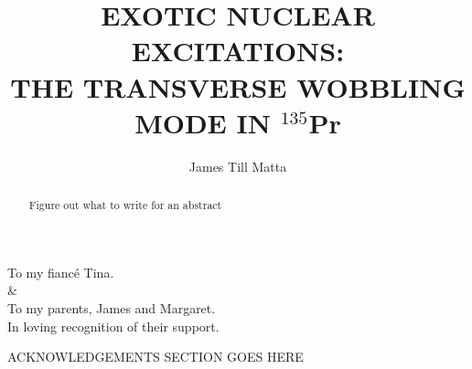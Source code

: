 \documentclass[final,numrefs,sort&compress]{nddiss2e}
\newcommand{\pr}{$^{135}$Pr}
\begin{document}
\frontmatter 
\title{EXOTIC NUCLEAR EXCITATIONS:\\
THE TRANSVERSE WOBBLING MODE IN \pr{}}
\author{James Till Matta}

\maketitle
%
%

\makecopyright

\begin{abstract}
  Figure out what to write for an abstract
\end{abstract}

\renewcommand{\dedicationname}{DEDICATED TO:}

\begin{dedication}
	To my fianc\'e Tina.\\\&\\To my parents, James and Margaret.\\
	In loving recognition of their support.
\end{dedication}

\tableofcontents
\listoffigures
\listoftables

\begin{acknowledge}
  ACKNOWLEDGEMENTS SECTION GOES HERE
\end{acknowledge}

\begin{symbols}
\end{symbols}

\mainmatter
%
%
\end{document}
